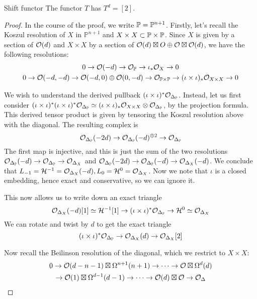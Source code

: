 \begin{theorem}{Shift functor}{}
    The functor $T$ has $T^d=[2]$.
\end{theorem}

\begin{proof}
    In the course of the proof, we write $\P=\mathbb{P}^{n+1}$. Firstly, let's recall the Koszul resolution of $X$ in $\mathbb{P}^{n+1}$ and $X\times X\subset \P\times \P$. Since $X$ is given by a section of $\O(d)$ and $X\times X$ by a section of $\O(d) \boxtimes O \oplus \O \boxtimes \O(d)$, we have the following resolutions: \begin{gather*}
        0\rightarrow \O(-d)\rightarrow \O_\P \rightarrow \iota_* \O_X\rightarrow 0\\
        0\rightarrow \O(-d,-d)\rightarrow \O(-d,0)\oplus \O(0,-d)\rightarrow \O_{\P\times \P}\rightarrow (\iota\times \iota)_* \O_{X\times X}\rightarrow 0
    \end{gather*}

    We wish to understand the derived pullback $(\iota\times \iota)^* \O_{\Delta_\P} $. Instead, let us first consider $(\iota\times \iota)^*(\iota\times \iota)^* \O_{\Delta_\P} \simeq (\iota\times \iota)_* \O_{X\times X} \otimes \O_{\Delta_\P}$, by the projection formula. This derived tensor product is given by tensoring the Koszul resolution above with the diagonal. The resulting complex is $$\O_{\Delta_\P}(-2d)\rightarrow \O_{\Delta_\P}(-d)^{\oplus 2}\rightarrow \O_{\Delta_\P}$$
    The first map is injective, and this is just the sum of the two resolutions $\O_{\Delta_\P}(-d)\rightarrow \O_{\Delta_\P}\rightarrow \O_{\Delta_X}$ and $\O_{\Delta_\P}(-2d)\rightarrow \O_{\Delta_\P}(-d)\rightarrow \O_{\Delta_X}(-d)$. We conclude that $L_{-1}=\calH^{-1}=\O_{\Delta_X}(-d), L_0=\calH^{0}=\O_{\Delta_X}$. Now we note that $\iota$ is a closed embedding, hence exact and conservative, so we can ignore it.

    This now allows us to write down an exact triangle $$\O_{\Delta_X}(-d)[1]\simeq \calH^{-1}[1]\rightarrow (\iota\times \iota)^*\O_{\Delta_\P}\rightarrow \calH^0\simeq \O_{\Delta_X}$$
    We can rotate and twist by $d$ to get the exact triangle 
    \begin{equation}\label{eqn:derivedtriangle}
        (\iota\times \iota)^*\O_{\Delta_\P}\rightarrow \O_{\Delta_X}(d)\rightarrow \O_{\Delta_X}[2]
    \end{equation}

    Now recall the Beilinson resolution of the diagonal, which we restrict to $X\times X$:\begin{gather*}
        0 \rightarrow \O (d-n-1)\boxtimes \Omega^{n+1}(n+1)\rightarrow \dots \rightarrow \O \boxtimes \Omega^{d}(d)\\
        \rightarrow \O(1)\boxtimes \Omega^{d-1}(d-1)\rightarrow \dots \rightarrow \O(d)\boxtimes \O \rightarrow \O_\Delta
    \end{gather*}


\end{proof}

